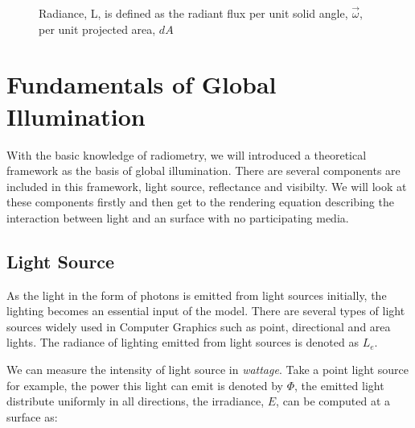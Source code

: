 \begin{figure}[htp] 
    \centering 
    \renewcommand{\thefigure}{\thechapter.\arabic{figure}}
    \caption[]{Radiance, L, is defined as the radiant flux per unit solid angle, \(\overrightarrow{\omega}\), per unit projected area, \(dA\)}
    \label{fig:radiance_solid_angle} 
\end{figure} 


\section{Fundamentals of Global Illumination}
With the basic knowledge of radiometry, we will introduced a theoretical framework as the basis of global illumination. There are several components are included in this framework, light source, reflectance and visibilty. We will look at these components firstly and then get to the rendering equation describing the interaction between light and an surface with no participating media. 

\subsection{Light Source} 
As the light in the form of photons is emitted from light sources initially, the lighting becomes an essential input of the model. There are several types of light sources widely used in Computer Graphics such as point, directional and area lights. The radiance of lighting emitted from light sources is denoted as \( L_{e} \). 

We can measure the intensity of light source in \emph{wattage}. Take a point light source for example, the power this light can emit is denoted by \(\Phi\), the emitted light distribute uniformly in all directions, the irradiance, \(E\), can be computed at a surface as: 

